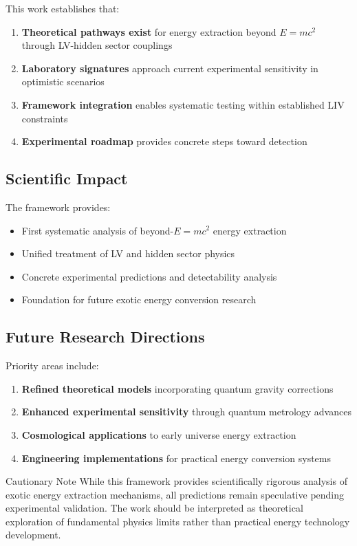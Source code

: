 \documentclass[12pt]{article}
\begin{document}
This work establishes that:

\begin{enumerate}
\item \textbf{Theoretical pathways exist} for energy extraction beyond $E=mc^2$ through LV-hidden sector couplings
\item \textbf{Laboratory signatures} approach current experimental sensitivity in optimistic scenarios
\item \textbf{Framework integration} enables systematic testing within established LIV constraints
\item \textbf{Experimental roadmap} provides concrete steps toward detection
\end{enumerate}

\subsection{Scientific Impact}

The framework provides:
\begin{itemize}
\item First systematic analysis of beyond-$E=mc^2$ energy extraction
\item Unified treatment of LV and hidden sector physics
\item Concrete experimental predictions and detectability analysis
\item Foundation for future exotic energy conversion research
\end{itemize}

\subsection{Future Research Directions}

Priority areas include:

\begin{enumerate}
\item \textbf{Refined theoretical models} incorporating quantum gravity corrections
\item \textbf{Enhanced experimental sensitivity} through quantum metrology advances
\item \textbf{Cosmological applications} to early universe energy extraction
\item \textbf{Engineering implementations} for practical energy conversion systems
\end{enumerate}

\begin{warningbox}{Cautionary Note}
While this framework provides scientifically rigorous analysis of exotic energy extraction mechanisms, all predictions remain speculative pending experimental validation. The work should be interpreted as theoretical exploration of fundamental physics limits rather than practical energy technology development.
\end{warningbox}
\end{document}
